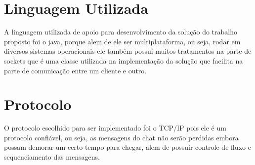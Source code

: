 \documentclass{abnt}
\begin{document}
	\section{Linguagem Utilizada}	
		A linguagem utilizada de apoio para desenvolvimento da solução do trabalho proposto foi o java, porque alem de ele ser multiplataforma, ou seja, rodar em diversos sistemas operacionais ele também possui muitos tratamentos na parte de sockets que é uma classe utilizada na implementação da solução que facilita na parte de comunicação entre um cliente e outro. \cite{ORACLE}
	
	\section{Protocolo}		
		O protocolo escolhido para ser implementado foi o TCP/IP pois ele é um protocolo confiável, ou seja, as mensagens do chat não serão perdidas embora possam demorar um certo tempo para chegar, alem de possuir controle de fluxo e sequenciamento das mensagens.



\clearpage
\nocite{*}
		
	
	
\end{document}
